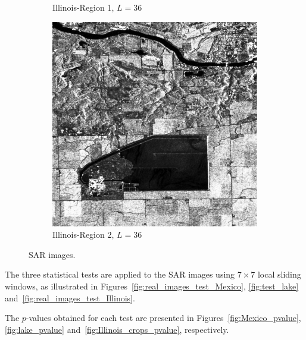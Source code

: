 \begin{figure}[H]
\begin{subfigure}[b]{0.3\textwidth}
    \caption{Illinois-Region 1, $L=36$}
    \label{fig:real_SAR_Images_coe-2}
  \end{subfigure}
  \hfill
  \begin{subfigure}[b]{0.3\textwidth}
    \centering
    \includegraphics[width=\textwidth]{../../Figures/PNG/Illinois_1024_36L}
     \caption{Illinois-Region 2,  $L=36$}
    \label{fig:real_SAR_Images_coe-3}
  \end{subfigure}
  \caption{SAR images. }
  \label{fig:real_SAR_Images_coe}
\end{figure}



The three statistical tests are applied to the SAR images using
\(7\times 7\) local sliding windows, as illustrated in
Figures~\ref{fig:real_images_test_Mexico}, \ref{fig:test_lake}
and~\ref{fig:real_images_test_Illinois}.

The \(p\)-values obtained for each test are presented in
Figures~\ref{fig:Mexico_pvalue}, \ref{fig:lake_pvalue}
and~\ref{fig:Illinois_crops_pvalue}, respectively.

